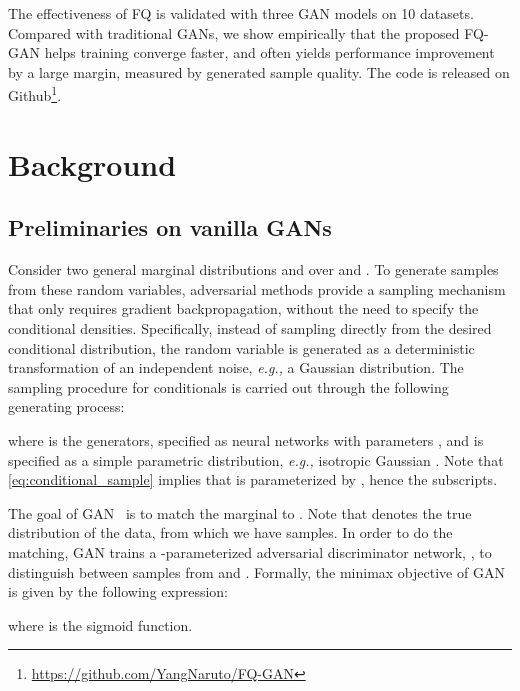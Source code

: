 \documentclass{article}
\newcommand{\eg}[0]{\emph{e.g., }}
\begin{document}
The effectiveness of FQ is validated with three GAN models on 10 datasets. Compared with traditional GANs, we show empirically that the proposed FQ-GAN helps training converge faster, and often yields performance improvement by a large margin, measured by generated sample quality. 
The code is released on Github\footnote{\url{https://github.com/YangNaruto/FQ-GAN}}.


\section{Background}

\subsection{Preliminaries on vanilla GANs}
Consider two general marginal distributions  and  over  and .
To generate samples from these random variables, adversarial methods \cite{goodfellow2014generative} provide a sampling mechanism that only requires gradient backpropagation, without the need to specify the conditional densities.
Specifically, instead of sampling directly from the desired conditional distribution, the random variable is generated as a deterministic transformation of an independent noise, \eg a Gaussian distribution. 
The sampling procedure for conditionals  is carried out through the following generating process:

where  is the generators, specified as neural networks with parameters , 
and  is specified as a simple parametric distribution, \eg isotropic Gaussian  . 
Note that \eqref{eq:conditional_sample} implies that  is parameterized by , hence the subscripts.

The goal of GAN~\cite{goodfellow2014generative} is to match the marginal
 to .
Note that  denotes the true distribution of the data, from which we have samples.
In order to do the matching, GAN trains a -parameterized adversarial discriminator network, , to distinguish between samples from  and .
Formally, the minimax objective of GAN is given by the following expression:

where  is the sigmoid function.
\end{document}
